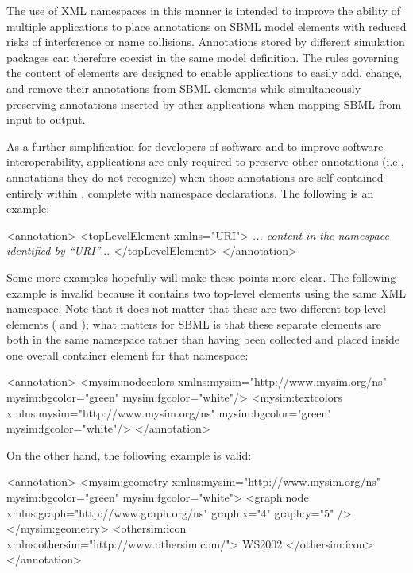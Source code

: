 The use of XML namespaces in this manner is intended to improve
the ability of multiple applications to place annotations on SBML
model elements with reduced risks of interference or name
collisions.  Annotations stored by different simulation packages
can therefore coexist in the same model definition.  The rules
governing the content of  elements are designed
to enable applications to easily add, change, and remove their
annotations from SBML elements while simultaneously preserving
annotations inserted by other applications when mapping SBML from
input to output.

As a further simplification for developers of software and to
improve software interoperability, applications are only required
to preserve other annotations (i.e., annotations they do not
recognize) when those annotations are self-contained entirely
within , complete with namespace declarations.
The following is an example:

\begin{example}
<annotation>
    <topLevelElement xmlns="URI">
       \textrm{\emph{... content in the namespace identified by \textquotedblleft{}URI\textquotedblright}...}
    </topLevelElement>
</annotation>
\end{example}

Some more examples hopefully will make these points more clear.
The following example is invalid because it contains two top-level
elements using the same XML namespace.  Note that it does not
matter that these are two different top-level elements
( and ); what matters for
SBML is that these separate elements are both in the same
namespace rather than having been collected and placed inside one
overall container element for that namespace:

\begin{example}
<annotation>
    <mysim:nodecolors xmlns:mysim="http://www.mysim.org/ns"
        mysim:bgcolor="green" mysim:fgcolor="white"/>
    <mysim:textcolors xmlns:mysim="http://www.mysim.org/ns"
        mysim:bgcolor="green" mysim:fgcolor="white"/>
</annotation>
\end{example}

On the other hand, the following example is valid:

\begin{example}
<annotation>
    <mysim:geometry xmlns:mysim="http://www.mysim.org/ns"
             mysim:bgcolor="green" mysim:fgcolor="white">
        <graph:node xmlns:graph="http://www.graph.org/ns" 
             graph:x="4" graph:y="5" />
    </mysim:geometry>
    <othersim:icon xmlns:othersim="http://www.othersim.com/">
        WS2002
    </othersim:icon>
</annotation>
\end{example}

